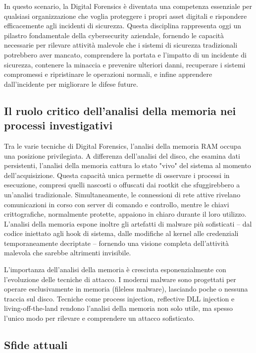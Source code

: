 In questo scenario, la Digital Forensics è diventata una competenza essenziale per qualsiasi organizzazione che voglia proteggere i propri asset digitali e rispondere efficacemente agli incidenti di sicurezza. Questa disciplina rappresenta oggi un pilastro fondamentale della cybersecurity aziendale, fornendo le capacità necessarie per rilevare attività malevole che i sistemi di sicurezza tradizionali potrebbero aver mancato, comprendere la portata e l'impatto di un incidente di sicurezza, contenere la minaccia e prevenire ulteriori danni, recuperare i sistemi compromessi e ripristinare le operazioni normali, e infine apprendere dall'incidente per migliorare le difese future.

\subsection{Il ruolo critico dell'analisi della memoria nei processi investigativi}

Tra le varie tecniche di Digital Forensics, l'analisi della memoria RAM occupa una posizione privilegiata. A differenza dell'analisi del disco, che esamina dati persistenti, l'analisi della memoria cattura lo stato "vivo" del sistema al momento dell'acquisizione. Questa capacità unica permette di osservare i processi in esecuzione, compresi quelli nascosti o offuscati dai rootkit che sfuggirebbero a un'analisi tradizionale. Simultaneamente, le connessioni di rete attive rivelano comunicazioni in corso con server di comando e controllo, mentre le chiavi crittografiche, normalmente protette, appaiono in chiaro durante il loro utilizzo. L'analisi della memoria espone inoltre gli artefatti di malware più sofisticati – dal codice iniettato agli hook di sistema, dalle modifiche al kernel alle credenziali temporaneamente decriptate – fornendo una visione completa dell'attività malevola che sarebbe altrimenti invisibile.

L'importanza dell'analisi della memoria è cresciuta esponenzialmente con l'evoluzione delle tecniche di attacco. I moderni malware sono progettati per operare esclusivamente in memoria (fileless malware), lasciando poche o nessuna traccia sul disco. Tecniche come process injection, reflective DLL injection e living-off-the-land rendono l'analisi della memoria non solo utile, ma spesso l'unico modo per rilevare e comprendere un attacco sofisticato.

\subsection{Sfide attuali}

